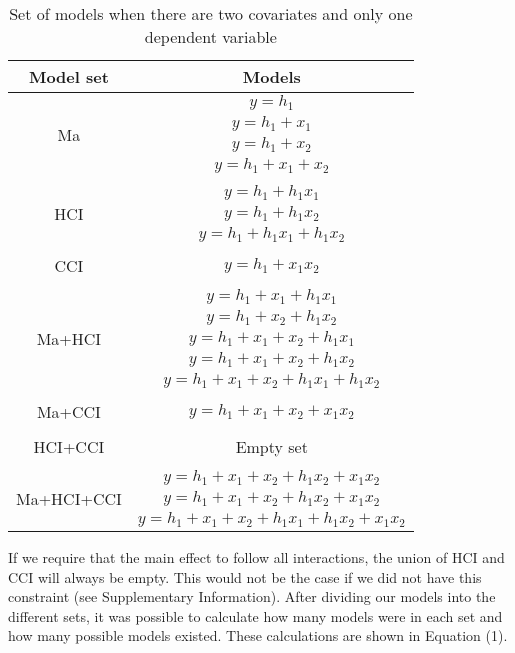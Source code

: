 \begin{table}[]
\caption{}
\caption*{\footnotesize Set of models when there are two covariates and only one dependent variable}
\centering
\begin{tabular}{cc}
\toprule
Model set & Models \\ 
\midrule
\multirow{4}{*}{Ma} & $y=h_1$ \\ & $y=h_1+x_1$ \\ & $y=h_1+x_2$ \\ & $y=h_1+x_1+x_2$  \\ & \\
\multirow{3}{*}{HCI} & $y=h_1+h_1x_1$ \\ & $y=h_1+h_1x_2$ \\ & $y=h_1+h_1x_1+h_1x_2$  \\& \\
CCI & $y=h_1+x_1x_2$ \\ & \\
\multirow{5}{*}{Ma+HCI} & $y=h_1+x_1+h_1x_1$  \\ & $y=h_1+x_2+h_1x_2$  \\& $y=h_1+x_1+x_2+h_1x_1$  \\& $y=h_1+x_1+x_2+h_1x_2$  \\& $y=h_1+x_1+x_2+h_1x_1+h_1x_2$ \\ & \\
Ma+CCI & $y=h_1+x_1+x_2+x_1x_2$ \\ & \\
HCI+CCI & Empty set \\ & \\
\multirow{3}{*}{Ma+HCI+CCI} & $y=h_1+x_1+x_2+h_1x_2+x_1x_2$ \\ & $y=h_1+x_1+x_2+h_1x_2+x_1x_2$ \\ & $y=h_1+x_1+x_2+h_1x_1+h_1x_2+x_1x_2$ \\
\bottomrule
\end{tabular}
\end{table}


If we require that the main effect to follow all interactions, the union of HCI and CCI will always be empty. This would not be the case if we did not have this constraint (see Supplementary Information). After dividing our models into the different sets, it was possible to calculate how many models were in each set and how many possible models existed. These calculations are shown in Equation (1). \\

